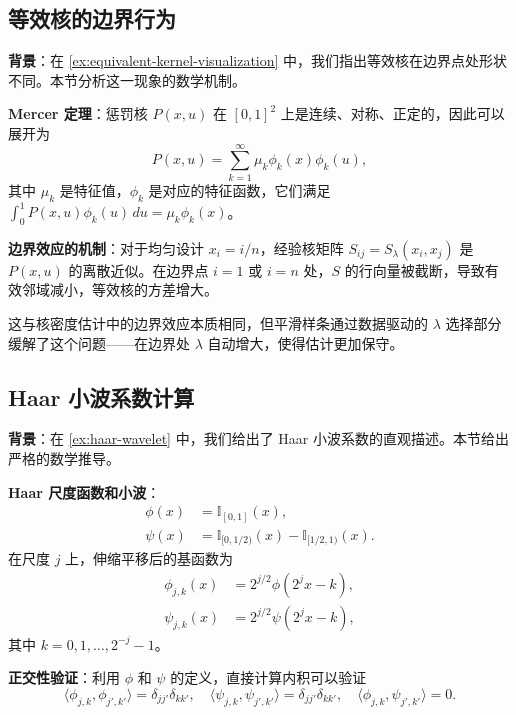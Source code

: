 \subsection{等效核的边界行为}\label{sec:derivation-equivalent-kernel-boundary}

\textbf{背景}：在 \cref{ex:equivalent-kernel-visualization} 中，我们指出等效核在边界点处形状不同。本节分析这一现象的数学机制。

\textbf{Mercer 定理}：惩罚核 $P(x, u)$ 在 $[0, 1]^2$ 上是连续、对称、正定的，因此可以展开为
\begin{equation}
P(x, u) = \sum_{k=1}^{\infty} \mu_k \phi_k(x) \phi_k(u),
\label{eq:penalty-kernel-mercer}
\end{equation}
其中 $\mu_k$ 是特征值，$\phi_k$ 是对应的特征函数，它们满足 $\int_0^1 P(x, u) \phi_k(u)\, du = \mu_k \phi_k(x)$。

\textbf{边界效应的机制}：对于均匀设计 $x_i = i/n$，经验核矩阵 $S_{ij} = S_\lambda(x_i, x_j)$ 是 $P(x, u)$ 的离散近似。在边界点 $i=1$ 或 $i=n$ 处，$S$ 的行向量被截断，导致有效邻域减小，等效核的方差增大。

这与核密度估计中的边界效应本质相同，但平滑样条通过数据驱动的 $\lambda$ 选择部分缓解了这个问题——在边界处 $\lambda$ 自动增大，使得估计更加保守。

\subsection{Haar 小波系数计算}\label{sec:derivation-wavelet-coefficient}

\textbf{背景}：在 \cref{ex:haar-wavelet} 中，我们给出了 Haar 小波系数的直观描述。本节给出严格的数学推导。

\textbf{Haar 尺度函数和小波}：
\begin{align}
\phi(x) &= \mathbb{I}_{[0,1]}(x), \label{eq:haar-scaling} \\
\psi(x) &= \mathbb{I}_{[0,1/2)}(x) - \mathbb{I}_{[1/2,1)}(x). \label{eq:haar-wavelet-function}
\end{align}
在尺度 $j$ 上，伸缩平移后的基函数为
\begin{align}
\phi_{j,k}(x) &= 2^{j/2} \phi(2^j x - k), \label{eq:haar-scaled-scaling} \\
\psi_{j,k}(x) &= 2^{j/2} \psi(2^j x - k), \label{eq:haar-scaled-wavelet}
\end{align}
其中 $k = 0, 1, \ldots, 2^{-j} - 1$。

\textbf{正交性验证}：利用 $\phi$ 和 $\psi$ 的定义，直接计算内积可以验证
\begin{equation}
\langle \phi_{j,k}, \phi_{j',k'} \rangle = \delta_{jj'} \delta_{kk'},\quad
\langle \psi_{j,k}, \psi_{j',k'} \rangle = \delta_{jj'} \delta_{kk'},\quad
\langle \phi_{j,k}, \psi_{j',k'} \rangle = 0.
\label{eq:haar-orthogonality}
\end{equation}

